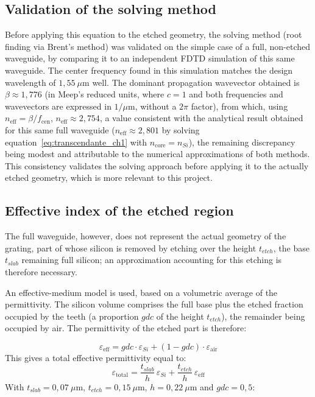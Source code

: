 \documentclass[a4paper,11pt]{report}
\begin{document}
\subsection*{Validation of the solving method}

Before applying this equation to the etched geometry, the solving method (root finding via Brent's method) was validated on the simple case of a full, non-etched waveguide, by comparing it to an independent FDTD simulation of this same waveguide. The center frequency found in this simulation matches the design wavelength of $1{,}55~\mu\text{m}$ well. The dominant propagation wavevector obtained is $\beta \approx 1{,}776$ (in Meep's reduced units, where $c=1$ and both frequencies and wavevectors are expressed in $1/\mu\text{m}$, without a $2\pi$ factor), from which, using $n_{\text{eff}} = \beta/f_{\text{cen}}$, $n_{\text{eff}} \approx 2{,}754$, a value consistent with the analytical result obtained for this same full waveguide ($n_{\text{eff}}\approx2{,}801$ by solving equation~\eqref{eq:transcendante_ch1} with $n_{\text{core}}=n_{Si}$), the remaining discrepancy being modest and attributable to the numerical approximations of both methods. This consistency validates the solving approach before applying it to the actually etched geometry, which is more relevant to this project.

\subsection*{Effective index of the etched region}

The full waveguide, however, does not represent the actual geometry of the grating, part of whose silicon is removed by etching over the height $t_{etch}$, the base $t_{slab}$ remaining full silicon; an approximation accounting for this etching is therefore necessary.

An effective-medium model is used, based on a volumetric average of the permittivity. The silicon volume comprises the full base plus the etched fraction occupied by the teeth (a proportion $gdc$ of the height $t_{etch}$), the remainder being occupied by air. The permittivity of the etched part is therefore:

\begin{equation}
\varepsilon_{\text{eff}} = gdc\cdot\varepsilon_{Si} + (1-gdc)\cdot\varepsilon_{\text{air}}
\end{equation}
This gives a total effective permittivity equal to:
\begin{equation}
\varepsilon_{\text{total}} = \frac{t_{slab}}{h}\,\varepsilon_{Si} + \frac{t_{etch}}{h}\,\varepsilon_{\text{eff}}
\end{equation}
With $t_{slab}=0{,}07~\mu\text{m}$, $t_{etch}=0{,}15~\mu\text{m}$, $h=0{,}22~\mu\text{m}$ and $gdc=0{,}5$:
\end{document}
